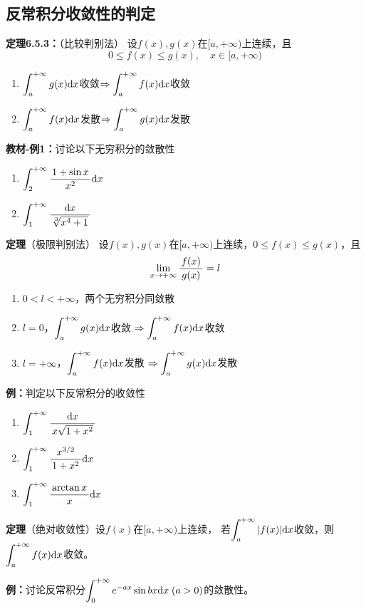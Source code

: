 \subsection{反常积分收敛性的判定}

{\bf 定理6.5.3：}（比较判别法）
设$f(x),g(x)$在$[a,+\infty)$上连续，且
$$0\leq f(x)\leq g(x),\quad x\in[a,+\infty)$$ 
\begin{enumerate}[(1)]
  \setlength{\itemindent}{1cm}
  \item
  $\displaystyle\int_a^{+\infty}g(x)\mathrm{d} x$收敛$\Rightarrow\displaystyle\int_a^{+\infty}f(x)\mathrm{d} x$收敛 
  \item $\displaystyle\int_a^{+\infty}f(x)\mathrm{d} x$发散$\Rightarrow\displaystyle\int_a^{+\infty}g(x)\mathrm{d} x$发散
\end{enumerate}

{\bf 教材-例1：}讨论以下无穷积分的敛散性
\begin{enumerate}[(1)]
  \setlength{\itemindent}{1cm}
  \item $\displaystyle\int_2^{+\infty}\displaystyle\frac{\,{1+\sin x}\,}{\,{x^2}\,}\mathrm{d} x$ 
  \item $\displaystyle\int_1^{+\infty}\displaystyle\frac{\,{\mathrm{d} x}\,}{\,{\sqrt[3]{x^4+1}}\,}$
\end{enumerate}

{\bf 定理}（极限判别法）
设$f(x),g(x)$在$[a,+\infty)$上连续，$0\leq f(x)\leq g(x)$，且
$$\lim\limits_{x\to{+\infty}}\displaystyle\frac{\,{f(x)}\,}{\,{g(x)}\,}=l$$ 
\begin{enumerate}[(1)]
  \setlength{\itemindent}{1cm}
  \item $0<l<+\infty$，两个无穷积分同敛散 
  \item
  $l=0$，$\displaystyle\int_a^{+\infty}g(x)\mathrm{d} x$收敛
  $\Rightarrow\displaystyle\int_a^{+\infty}f(x)\mathrm{d} x$收敛 
  \item
  $l=+\infty$，$\displaystyle\int_a^{+\infty}f(x)\mathrm{d} x$发散
  $\Rightarrow\displaystyle\int_a^{+\infty}g(x)\mathrm{d} x$发散
\end{enumerate}

{\bf 例：}判定以下反常积分的收敛性
\begin{enumerate}[(1)]
  \setlength{\itemindent}{1cm}
  \item $\displaystyle\int_1^{+\infty}\displaystyle\frac{\,{\mathrm{d} x}\,}{\,{x\sqrt{1+x^2}}\,}$ 
  \item $\displaystyle\int_1^{+\infty}\displaystyle\frac{\,{x^{3/2}}\,}{\,{1+x^2}\,}\mathrm{d} x$ 
  \item $\displaystyle\int_1^{+\infty}\displaystyle\frac{\,{\arctan x}\,}{\,{x}\,}\mathrm{d} x$
\end{enumerate}

{\bf 定理}（绝对收敛性）设$f(x)$在$[a,+\infty)$上连续，
若$\displaystyle\int_a^{+\infty}|f(x)|\mathrm{d} x$收敛，则
$\displaystyle\int_a^{+\infty}f(x)\mathrm{d} x$收敛。

{\bf 例：}讨论反常积分$\displaystyle\int_0^{+\infty}e^{-ax}\sin bx\mathrm{d} x\;(a>0)$的敛散性。

